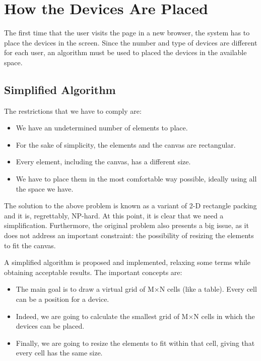 \section{How the Devices Are Placed} %
\label{sec:positioning}

The first time that the user visits the page in a new browser, the system has to place the devices in the screen.
Since the number and type of devices are different for each user, an algorithm must be used to placed the devices in the available space.

\subsection{Simplified Algorithm} %
\label{sub:algorithm}

The restrictions that we have to comply are:

\begin{itemize}

  \item We have an undetermined number of elements to place.

  \item For the sake of simplicity, the elements and the canvas are rectangular.

  \item Every element, including the canvas, has a different size.

  \item We have to place them in the most comfortable way possible, ideally using all the space we have.
\end{itemize}

The solution to the above problem is known as a variant of 2-D rectangle packing and it is, regrettably, NP-hard.
At this point, it is clear that we need a simplification.
Furthermore, the original problem also presents a big issue, as it does not address an important constraint: the possibility of resizing the elements to fit the canvas.

A simplified algorithm is proposed and implemented, relaxing some terms while obtaining acceptable results.
The important concepts are:

\begin{itemize}

  \item The main goal is to draw a virtual grid of M$\times$N cells (like a table).
  Every cell can be a position for a device.

  \item Indeed, we are going to calculate the smallest grid of M$\times$N cells in which the devices can be placed.

  \item Finally, we are going to resize the elements to fit within that cell, giving that every cell has the same size.

\end{itemize}

